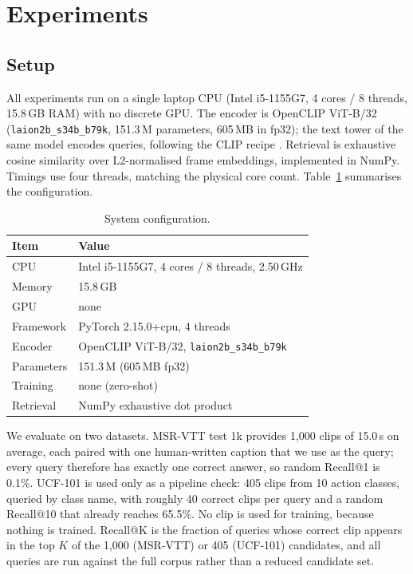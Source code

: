 \documentclass[journal]{IEEEtran}
\begin{document}
\section{Experiments}\label{sec:exp}

\subsection{Setup}
All experiments run on a single laptop CPU (Intel i5-1155G7, 4 cores / 8 threads, 15.8\,GB RAM)
with no discrete GPU. The encoder is OpenCLIP ViT-B/32 \cite{cherti2023reproducible}
(\texttt{laion2b\_s34b\_b79k}, 151.3\,M parameters, 605\,MB in fp32); the text tower of the same
model encodes queries, following the CLIP recipe \cite{radford2021clip}. Retrieval is exhaustive
cosine similarity over L2-normalised frame embeddings, implemented in NumPy. Timings use four
threads, matching the physical core count. Table~\ref{tab:setup} summarises the configuration.

\begin{table}[t]
\centering
\caption{System configuration.}
\label{tab:setup}
\begin{tabular*}{\columnwidth}{@{\extracolsep{\fill}}ll@{}}
\toprule
Item & Value \\
\midrule
CPU        & Intel i5-1155G7, 4 cores / 8 threads, 2.50\,GHz \\
Memory     & 15.8\,GB \\
GPU        & none \\
Framework  & PyTorch 2.15.0+cpu, 4 threads \\
Encoder    & OpenCLIP ViT-B/32, \texttt{laion2b\_s34b\_b79k} \\
Parameters & 151.3\,M (605\,MB fp32) \\
Training   & none (zero-shot) \\
Retrieval  & NumPy exhaustive dot product \\
\bottomrule
\end{tabular*}
\end{table}

We evaluate on two datasets. MSR-VTT test 1k \cite{xu2016msrvtt} provides 1{,}000 clips of
15.0\,s on average, each paired with one human-written caption that we use as the query; every
query therefore has exactly one correct answer, so random Recall@1 is 0.1\%. UCF-101
\cite{soomro2012ucf101} is used only as a pipeline check: 405 clips from 10 action classes,
queried by class name, with roughly 40 correct clips per query and a random Recall@10 that
already reaches 65.5\%. No clip is used for training, because nothing is trained. Recall@K is
the fraction of queries whose correct clip appears in the top $K$ of the 1{,}000 (MSR-VTT) or
405 (UCF-101) candidates, and all queries are run against the full corpus rather than a reduced
candidate set.
\end{document}
